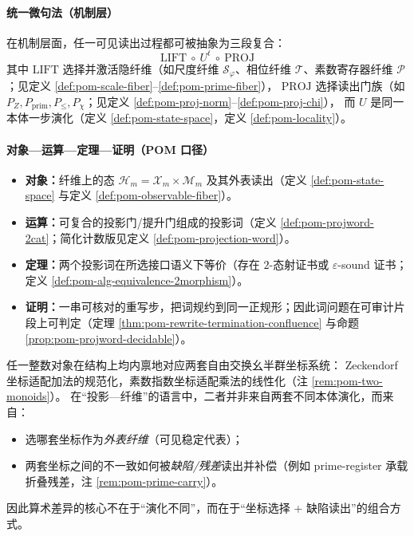 \paragraph{统一微句法（机制层）}
在机制层面，任一可见读出过程都可被抽象为三段复合：
\[
\boxed{\;
\mathrm{LIFT}\ \circ\ U^{t}\ \circ\ \mathrm{PROJ}\;}
\]
其中 \(\mathrm{LIFT}\) 选择并激活隐纤维（如尺度纤维 \(\mathcal S_\varphi\)、相位纤维 \(\mathcal T\)、素数寄存器纤维 \(\mathcal P\)；见定义 \ref{def:pom-scale-fiber}--\ref{def:pom-prime-fiber}），
\(\mathrm{PROJ}\) 选择读出门族（如 \(P_Z,P_{\mathrm{prim}},P_{\le},P_\chi\)；见定义 \ref{def:pom-proj-norm}--\ref{def:pom-proj-chi}），
而 \(U\) 是同一本体一步演化（定义 \ref{def:pom-state-space}，定义 \ref{def:pom-locality}）。


\paragraph{对象—运算—定理—证明（POM 口径）}
\begin{itemize}
  \item \textbf{对象：}纤维上的态 \(\mathcal{H}_m=\mathcal{X}_m\times \mathcal{M}_m\) 及其外表读出（定义 \ref{def:pom-state-space} 与定义 \ref{def:pom-observable-fiber}）。
  \item \textbf{运算：}可复合的投影门/提升门组成的投影词（定义 \ref{def:pom-projword-2cat}；简化计数版见定义 \ref{def:pom-projection-word}）。
  \item \textbf{定理：}两个投影词在所选接口语义下等价（存在 \(2\)-态射证书或 \(\varepsilon\)-sound 证书；定义 \ref{def:pom-alg-equivalence-2morphism}）。
  \item \textbf{证明：}一串可核对的重写步，把词规约到同一正规形；因此词问题在可审计片段上可判定（定理 \ref{thm:pom-rewrite-termination-confluence} 与命题 \ref{prop:pom-projword-decidable}）。
\end{itemize}

\begin{remark}\label{rem:pom-coordinate-defect-principle}
任一整数对象在结构上均内禀地对应两套自由交换幺半群坐标系统：
Zeckendorf 坐标适配加法的规范化，素数指数坐标适配乘法的线性化（注 \ref{rem:pom-two-monoids}）。
在“投影—纤维”的语言中，二者并非来自两套不同本体演化，而来自：
\begin{itemize}
  \item 选哪套坐标作为\emph{外表纤维}（可见稳定代表）；
  \item 两套坐标之间的不一致如何被\emph{缺陷/残差}读出并补偿（例如 prime-register 承载折叠残差，注 \ref{rem:pom-prime-carry}）。
\end{itemize}
因此算术差异的核心不在于“演化不同”，而在于“坐标选择 + 缺陷读出”的组合方式。
\end{remark}

